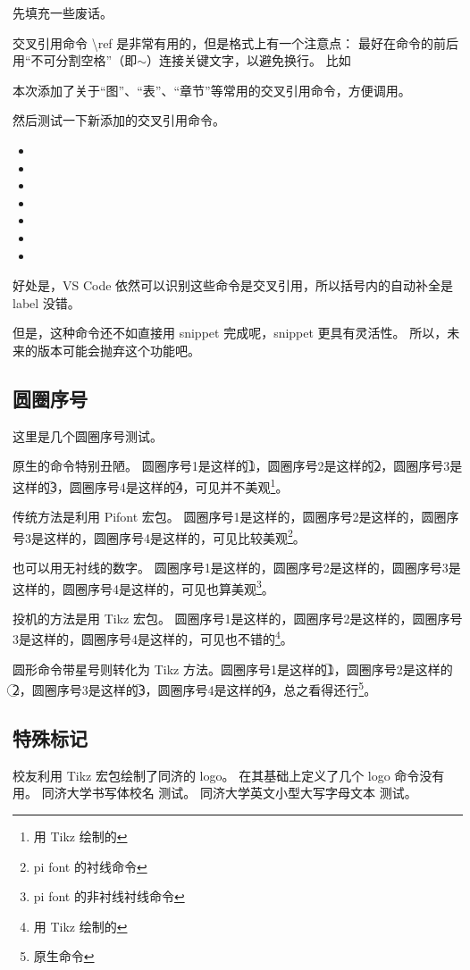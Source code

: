 \documentclass[../Main/thesis]{subfiles}
\begin{document}
先填充一些废话。\zhlipsum[10]

交叉引用命令 \textbackslash ref 是非常有用的，但是格式上有一个注意点：
最好在命令的前后用“不可分割空格”（即$\sim$）连接关键文字，以避免换行。
比如

本次添加了关于“图”、“表”、“章节”等常用的交叉引用命令，方便调用。

然后测试一下新添加的交叉引用命令。
\begin{itemize}[\textbullet]
  \item {}
  \item {}
  \item {}
  \item {}
  \item {}
  \item {}
  \item {}
\end{itemize}

好处是，VS Code 依然可以识别这些命令是交叉引用，所以括号内的自动补全是 label 没错。

但是，这种命令还不如直接用 snippet 完成呢，snippet 更具有灵活性。
所以，未来的版本可能会抛弃这个功能吧。

\subsection{圆圈序号}
这里是几个圆圈序号测试。

原生的命令特别丑陋。
圆圈序号1是这样的\textcircled{1}，圆圈序号2是这样的\textcircled{2}，圆圈序号3是这样的\textcircled{3}，圆圈序号4是这样的\textcircled{4}，可见并不美观\footnote{用 Tikz 绘制的}。

传统方法是利用 Pifont 宏包。
圆圈序号1是这样的，圆圈序号2是这样的，圆圈序号3是这样的，圆圈序号4是这样的，可见比较美观\footnote{pi font 的衬线命令}。

也可以用无衬线的数字。
圆圈序号1是这样的，圆圈序号2是这样的，圆圈序号3是这样的，圆圈序号4是这样的，可见也算美观\footnote{pi font 的非衬线衬线命令}。

投机的方法是用 Tikz 宏包。
圆圈序号1是这样的，圆圈序号2是这样的，圆圈序号3是这样的，圆圈序号4是这样的，可见也不错的\footnote{用 Tikz 绘制的}。

圆形命令带星号则转化为 Tikz 方法。圆圈序号1是这样的\textcircled*{1}，圆圈序号2是这样的\textcircled*{2}，圆圈序号3是这样的\textcircled*{3}，圆圈序号4是这样的\textcircled*{4}，总之看得还行\footnote{原生命令}。

\subsection{特殊标记}
校友利用 Tikz 宏包绘制了同济的 logo。
在其基础上定义了几个 logo 命令没有用。
同济大学书写体校名 \tongjiname 测试。
同济大学英文小型大写字母文本 \tongjithesis 测试。
\end{document}

